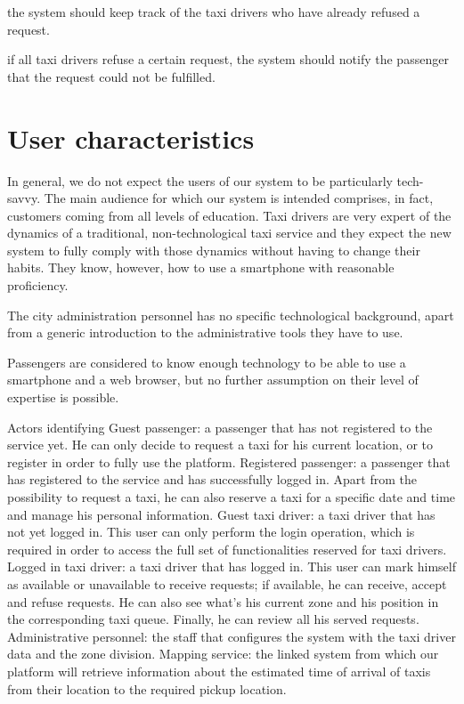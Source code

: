the system should keep track of the taxi drivers who have already refused a request. 

if all taxi drivers refuse a certain request, the system should notify the passenger that the request could not be fulfilled.


\section{User characteristics}
In general, we do not expect the users of our system to be particularly tech-savvy. 
The main audience for which our system is intended comprises, in fact, customers coming from all levels of education.
Taxi drivers are very expert of the dynamics of a traditional, non-technological taxi service and they expect the new system to fully comply with those dynamics without having to change their habits. They know, however, how to use a smartphone with reasonable proficiency.

The city administration personnel has no specific technological background, apart from a generic introduction to the administrative tools they have to use.

Passengers are considered to know enough technology to be able to use a smartphone and a web browser, but no further assumption on their level of expertise is possible. 


Actors identifying
Guest passenger: a passenger that has not registered to the service yet. He can only decide to request a taxi for his current location, or to register in order to fully use the platform. 
Registered passenger: a passenger that has registered to the service and has successfully logged in. Apart from the possibility to request a taxi, he can also reserve a taxi for a specific date and time and manage his personal information.
Guest taxi driver: a taxi driver that has not yet logged in. This user can only perform the login operation, which is required in order to access the full set of functionalities reserved for taxi drivers. 
Logged in taxi driver: a taxi driver that has logged in. This user can mark himself as available or unavailable to receive requests; if available, he can receive, accept and refuse requests. He can also see what’s his current zone and his position in the corresponding taxi queue. Finally, he can review all his served requests.
Administrative personnel: the staff that configures the system with the taxi driver data and the zone division. 
Mapping service: the linked system from which our platform will retrieve information about the estimated time of arrival of taxis from their location to the required pickup location.


